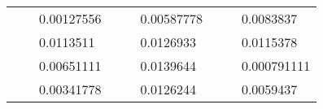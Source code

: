 \begin{table}[H]
\begin{tabular}{|cclcclccc}
\rowcolor[HTML]{DDFDFF} 
\multicolumn{1}{|c|}{\cellcolor[HTML]{FFFFC7}}                                & \multicolumn{1}{c|}{\cellcolor[HTML]{DDFDFF}}                      & \multicolumn{1}{l|}{\cellcolor[HTML]{DAE8FC}0.00127556}  & \multicolumn{1}{c|}{\cellcolor[HTML]{FFFFC7}}                                & \multicolumn{1}{c|}{\cellcolor[HTML]{DDFDFF}}                       & \multicolumn{1}{l|}{\cellcolor[HTML]{DDFDFF}0.00587778}  & \multicolumn{1}{c|}{\cellcolor[HTML]{FFFFC7}}                                & \multicolumn{1}{c|}{\cellcolor[HTML]{DDFDFF}}                      & \multicolumn{1}{l|}{\cellcolor[HTML]{DDFDFF}0.0083837}   \\ \cline{3-3} \cline{6-6} \cline{9-9} 
\multicolumn{1}{|c|}{\cellcolor[HTML]{FFFFC7}}                                & \multicolumn{1}{c|}{\cellcolor[HTML]{DDFDFF}}                      & \multicolumn{1}{l|}{\cellcolor[HTML]{DDFDFF}0.0113511}   & \multicolumn{1}{c|}{\cellcolor[HTML]{FFFFC7}}                                & \multicolumn{1}{c|}{\cellcolor[HTML]{DDFDFF}}                       & \multicolumn{1}{l|}{\cellcolor[HTML]{DAE8FC}0.0126933}   & \multicolumn{1}{c|}{\cellcolor[HTML]{FFFFC7}}                                & \multicolumn{1}{c|}{\cellcolor[HTML]{DDFDFF}}                      & \multicolumn{1}{l|}{\cellcolor[HTML]{DAE8FC}0.0115378}   \\ \cline{3-3} \cline{6-6} \cline{9-9} 
\rowcolor[HTML]{DDFDFF} 
\multicolumn{1}{|c|}{\cellcolor[HTML]{FFFFC7}}                                & \multicolumn{1}{c|}{\cellcolor[HTML]{DDFDFF}}                      & \multicolumn{1}{l|}{\cellcolor[HTML]{DAE8FC}0.00651111}  & \multicolumn{1}{c|}{\cellcolor[HTML]{FFFFC7}}                                & \multicolumn{1}{c|}{\cellcolor[HTML]{DDFDFF}}                       & \multicolumn{1}{l|}{\cellcolor[HTML]{DDFDFF}0.0139644}   & \multicolumn{1}{c|}{\cellcolor[HTML]{FFFFC7}}                                & \multicolumn{1}{c|}{\cellcolor[HTML]{DDFDFF}}                      & \multicolumn{1}{l|}{\cellcolor[HTML]{DDFDFF}0.000791111} \\ \cline{3-3} \cline{6-6} \cline{9-9} 
\multicolumn{1}{|c|}{\cellcolor[HTML]{FFFFC7}}                                & \multicolumn{1}{c|}{\cellcolor[HTML]{DDFDFF}}                      & \multicolumn{1}{l|}{\cellcolor[HTML]{DDFDFF}0.00341778}  & \multicolumn{1}{c|}{\cellcolor[HTML]{FFFFC7}}                                & \multicolumn{1}{c|}{\cellcolor[HTML]{DDFDFF}}                       & \multicolumn{1}{l|}{\cellcolor[HTML]{DAE8FC}0.0126244}   & \multicolumn{1}{c|}{\cellcolor[HTML]{FFFFC7}}                                & \multicolumn{1}{c|}{\cellcolor[HTML]{DDFDFF}}                      & \multicolumn{1}{l|}{\cellcolor[HTML]{DAE8FC}0.0059437}   \\ \cline{3-3} \cline{6-6} \cline{9-9} 

\end{tabular}
\end{table}
